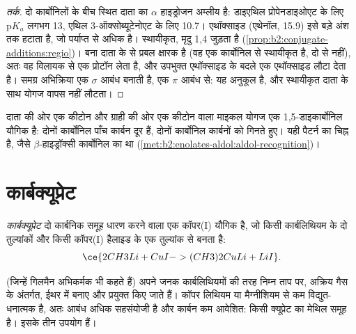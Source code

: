 \begin{proof}[तर्क]
दो कार्बोनिलों के बीच स्थित दाता का $\alpha$ हाइड्रोजन अम्लीय है: डाइएथिल प्रोपेनडाइओएट के लिए $\mathrm pK_a$ लगभग 13,
एथिल 3-ऑक्सोब्यूटेनोएट के लिए 10.7। एथॉक्साइड (एथेनॉल, 15.9) इसे बड़े अंश तक हटाता है, जो
पर्याप्त से अधिक है। स्थायीकृत, मृदु  1,4 जुड़ता है
(\cref{prop:b2:conjugate-additions:regio})। बना  दाता के  से प्रबल क्षारक है
(वह एक कार्बोनिल से स्थायीकृत है, दो से नहीं), अतः वह विलायक से एक प्रोटॉन लेता है, और
उपभुक्त एथॉक्साइड के बदले एक एथॉक्साइड लौटा देता है। समग्र अभिक्रिया एक  $\sigma$ आबंध बनाती है,
एक  $\pi$ आबंध से: यह अनुकूल है, और स्थायीकृत दाता के साथ योगज वापस नहीं लौटता।
\end{proof}

दाता की ओर एक कीटोन और ग्राही की ओर एक कीटोन वाला माइकल योगज एक 1,5-डाइकार्बोनिल
यौगिक है: दोनों कार्बोनिल पाँच कार्बन दूर हैं, दोनों कार्बोनिल कार्बनों को गिनते हुए। यही पैटर्न
 का चिह्न है, जैसे $\beta$-हाइड्रॉक्सी कार्बोनिल  का था
(\cref{met:b2:enolates-aldol:aldol-recognition})।

\section{कार्बक्यूप्रेट}

\begin{definition}[कार्बक्यूप्रेट]\label{def:b2:conjugate-additions:cuprate}
\emph{कार्बक्यूप्रेट}  दो कार्बनिक समूह धारण करने वाला एक कॉपर(I) यौगिक है,
जो किसी कार्बलिथियम के दो तुल्यांकों और किसी कॉपर(I) हैलाइड के एक तुल्यांक से बनता है:
\begin{equation*}
\ce{2 CH3Li + CuI -> (CH3)2CuLi + LiI}.
\end{equation*}
\end{definition}

 (जिन्हें गिलमैन अभिकर्मक भी कहते हैं) अपने जनक कार्बलिथियमों की तरह निम्न ताप पर,
अक्रिय गैस के अंतर्गत, ईथर में बनाए और प्रयुक्त किए जाते हैं। कॉपर लिथियम या
मैग्नीशियम से कम विद्युत-धनात्मक है, अतः  आबंध अधिक सहसंयोजी है और कार्बन कम आवेशित: किसी
क्यूप्रेट का मेथिल समूह  है। इसके तीन उपयोग हैं।

